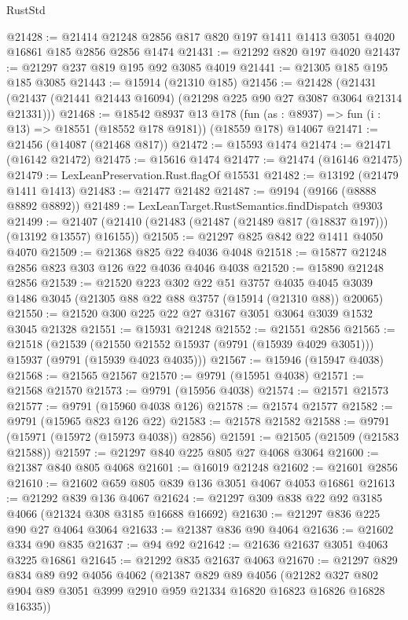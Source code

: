 \begin{lexlean}{RustStd}
\begin{coremodule}
@21428 := @21414 @21248 @2856 @817 @820 @197 @1411 @1413 @3051 @4020 @16861 @185 @2856 @2856 @1474
@21431 := @21292 @820 @197 @4020
@21437 := @21297 @237 @819 @195 @92 @3085 @4019
@21441 := @21305 @185 @195 @185 @3085
@21443 := @15914 (@21310 @185)
@21456 := @21428
    (@21431 (@21437 (@21441 @21443 @16094) (@21298 @225 @90 @27 @3087 @3064 @21314 @21331)))
@21468 := @18542
    @8937
    @13
    @178
    (fun (as : @8937) => fun (i : @13) => @18551 (@18552 @178 @9181))
    (@18559 @178)
    @14067
@21471 := @21456 (@14087 (@21468 @817))
@21472 := @15593 @1474
@21474 := @21471 (@16142 @21472)
@21475 := @15616 @1474
@21477 := @21474 (@16146 @21475)
@21479 := LexLeanPreservation.Rust.flagOf @15531
@21482 := @13192 (@21479 @1411 @1413)
@21483 := @21477 @21482
@21487 := @9194 (@9166 (@8888 @8892 @8892))
@21489 := LexLeanTarget.RustSemantics.findDispatch @9303
@21499 := @21407 (@21410 (@21483 (@21487 (@21489 @817 (@18837 @197))) (@13192 @13557) @16155))
@21505 := @21297 @825 @842 @22 @1411 @4050 @4070
@21509 := @21368 @825 @22 @4036 @4048
@21518 := @15877 @21248 @2856 @823 @303 @126 @22 @4036 @4046 @4038
@21520 := @15890 @21248 @2856
@21539 := @21520
    @223
    @302
    @22
    @51
    @3757
    @4035
    @4045
    @3039
    @1486
    @3045
    (@21305 @88 @22 @88 @3757 (@15914 (@21310 @88)) @20065)
@21550 := @21520 @300 @225 @22 @27 @3167 @3051 @3064 @3039 @1532 @3045 @21328
@21551 := @15931 @21248
@21552 := @21551 @2856
@21565 := @21518
    (@21539 (@21550 @21552 @15937 (@9791 (@15939 @4029 @3051))) @15937 (@9791 (@15939 @4023 @4035)))
@21567 := @15946 (@15947 @4038)
@21568 := @21565 @21567
@21570 := @9791 (@15951 @4038)
@21571 := @21568 @21570
@21573 := @9791 (@15956 @4038)
@21574 := @21571 @21573
@21577 := @9791 (@15960 @4038 @126)
@21578 := @21574 @21577
@21582 := @9791 (@15965 @823 @126 @22)
@21583 := @21578 @21582
@21588 := @9791 (@15971 (@15972 (@15973 @4038)) @2856)
@21591 := @21505 (@21509 (@21583 @21588))
@21597 := @21297 @840 @225 @805 @27 @4068 @3064
@21600 := @21387 @840 @805 @4068
@21601 := @16019 @21248
@21602 := @21601 @2856
@21610 := @21602 @659 @805 @839 @136 @3051 @4067 @4053 @16861
@21613 := @21292 @839 @136 @4067
@21624 := @21297 @309 @838 @22 @92 @3185 @4066 (@21324 @308 @3185 @16688 @16692)
@21630 := @21297 @836 @225 @90 @27 @4064 @3064
@21633 := @21387 @836 @90 @4064
@21636 := @21602 @334 @90 @835
@21637 := @94 @92
@21642 := @21636 @21637 @3051 @4063 @3225 @16861
@21645 := @21292 @835 @21637 @4063
@21670 := @21297
    @829
    @834
    @89
    @92
    @4056
    @4062
    (@21387
      @829
      @89
      @4056
      (@21282 @327 @802 @904 @89 @3051 @3999 @2910 @959 @21334 @16820 @16823 @16826 @16828 @16335))

\end{coremodule}
\end{lexlean}
